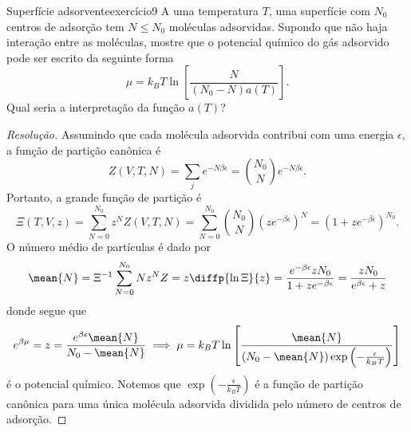 \begin{exercício}{Superfície adsorvente}{exercício9}
    A uma temperatura \(T\), uma superfície com \(N_0\) centros de adsorção tem \(N \leq N_0\) moléculas adsorvidas. Supondo que não haja interação entre as moléculas, mostre que o potencial químico do gás adsorvido pode ser escrito da seguinte forma
    \begin{equation*}
        \mu = k_BT \ln\left[\frac{N}{(N_0 - N) a(T)}\right].
    \end{equation*}
    Qual seria a interpretação da função \(a(T)\)?
\end{exercício}
\begin{proof}[Resolução]
    Assumindo que cada molécula adsorvida contribui com uma energia \(\epsilon\), a função de partição canônica é
    \begin{equation*}
        Z(V, T, N) = \sum_{j} e^{-N \beta \epsilon} = \binom{N_0}{N} e^{-N \beta \epsilon}.
    \end{equation*}
    Portanto, a grande função de partição é
    \begin{equation*}
        \Xi(T, V, z) = \sum_{N=0}^{N_0} z^N Z(V, T, N) = \sum_{N = 0}^{N_0} \binom{N_0}{N} \left(z e^{-\beta \epsilon}\right)^{N} = \left(1 + ze^{-\beta \epsilon}\right)^{N_0}.
    \end{equation*}
    O número médio de partículas é dado por
    \begin{equation*}
        \mean{N} = \Xi^{-1}\sum_{N=0}^{N_0} Nz^N Z = z\diffp{\ln \Xi}{z} = \frac{e^{-\beta \epsilon}z N_0}{1 + z e^{-\beta \epsilon}} = \frac{z N_0}{e^{\beta \epsilon} + z}
    \end{equation*}
    donde segue que
    \begin{equation*}
        e^{\beta \mu} = z = \frac{e^{\beta \epsilon}\mean{N}}{N_0 - \mean{N}} \implies \mu = k_BT \ln\left[\frac{\mean{N}}{\left(N_0 - \mean{N}\right)\exp\left(-\frac{\epsilon}{k_B T}\right)}\right]
    \end{equation*}
    é o potencial químico. Notemos que \(\exp\left(-\frac{\epsilon}{k_BT}\right)\) é a função de partição canônica para uma única molécula adsorvida dividida pelo número de centros de adsorção.
\end{proof}
